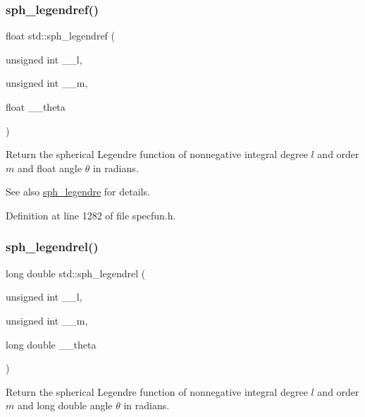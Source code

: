 \subsubsection{\texorpdfstring{sph\+\_\+legendref()}{sph\_legendref()}}
{\footnotesize\ttfamily float std\+::sph\+\_\+legendref (\begin{DoxyParamCaption}\item[{unsigned int}]{\+\_\+\+\_\+l,  }\item[{unsigned int}]{\+\_\+\+\_\+m,  }\item[{float}]{\+\_\+\+\_\+theta }\end{DoxyParamCaption})\hspace{0.3cm}{\ttfamily [inline]}}

Return the spherical Legendre function of nonnegative integral degree $ l $ and order $ m $ and float angle $ \theta $ in radians.

\begin{DoxySeeAlso}{See also}
\hyperlink{group__tr29124__math__spec__func_ga5b33a8e403bfa3c6df370e163310d66c}{sph\+\_\+legendre} for details. 
\end{DoxySeeAlso}


Definition at line 1282 of file specfun.\+h.

\mbox{\label{group__tr29124__math__spec__func_ga2f6618dea1847f09fd67f3c974c1910d}} 
\subsubsection{\texorpdfstring{sph\+\_\+legendrel()}{sph\_legendrel()}}
{\footnotesize\ttfamily long double std\+::sph\+\_\+legendrel (\begin{DoxyParamCaption}\item[{unsigned int}]{\+\_\+\+\_\+l,  }\item[{unsigned int}]{\+\_\+\+\_\+m,  }\item[{long double}]{\+\_\+\+\_\+theta }\end{DoxyParamCaption})\hspace{0.3cm}{\ttfamily [inline]}}

Return the spherical Legendre function of nonnegative integral degree $ l $ and order $ m $ and {\ttfamily long double} angle $ \theta $ in radians.


